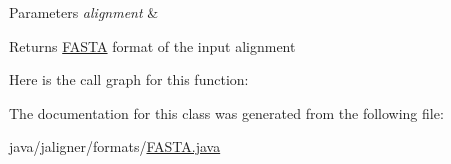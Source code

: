 \begin{DoxyParams}{Parameters}
{\em alignment} & \\
\hline
\end{DoxyParams}
\begin{DoxyReturn}{Returns}
\hyperlink{classjaligner_1_1formats_1_1_f_a_s_t_a}{F\+A\+S\+T\+A} format of the input alignment 
\end{DoxyReturn}


Here is the call graph for this function\+:




The documentation for this class was generated from the following file\+:\begin{DoxyCompactItemize}
\item 
java/jaligner/formats/\hyperlink{_f_a_s_t_a_8java}{F\+A\+S\+T\+A.\+java}\end{DoxyCompactItemize}
